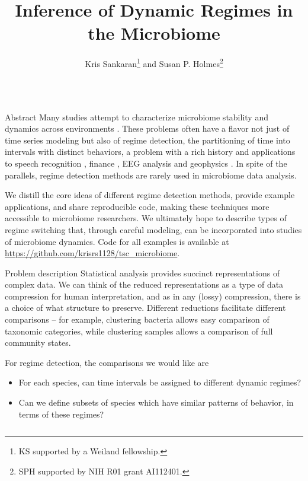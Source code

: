 \documentclass[final, 8pt]{beamer}
\title{Inference of Dynamic Regimes in the Microbiome}
\author{Kris Sankaran\footnote{KS supported by a Weiland fellowship.} and Susan P. Holmes\footnote{SPH supported by NIH R01 grant AI112401.}}
\institute{Department of Statistics, Stanford University}
\newlength{\onecolwid}
\begin{document}
\begin{frame}

\begin{columns}
\begin{column}{\onecolwid}

\begin{block}{Abstract}
Many studies attempt to characterize microbiome stability and dynamics across
environments \citep{costello2012application, stein2013ecological,
  faust2015metagenomics}. These problems often have a flavor not just of time
series modeling but also of regime detection, the partitioning of time into
intervals with distinct behaviors, a problem with a rich history and applications
to speech recognition \citep{fox2011sticky}, finance \citep{lee2009optimal}, EEG
analysis \citep{camilleri2014automatic} and geophysics
\citep{weatherley2002relationship}. In spite of the parallels, regime detection
methods are rarely used in microbiome data analysis.

We distill the core ideas of different regime detection methods, provide example
applications, and share reproducible code, making these techniques more
accessible to microbiome researchers. We ultimately hope to describe types of
regime switching that, through careful modeling, can be incorporated into
studies of microbiome dynamics. Code for all examples is available at
\url{https://github.com/krisrs1128/tsc\_microbiome}.
\end{block}

\begin{block}{Problem description}
Statistical analysis provides succinct representations of complex data. We can
think of the reduced representations as a type of data compression for human
interpretation, and as in any (lossy) compression, there is a choice of what
structure to preserve. Different reductions facilitate different comparisons --
for example, clustering bacteria allows easy comparison of taxonomic categories,
while clustering samples allows a comparison of full community states.

For regime detection, the comparisons we would like are
\begin{itemize}
\item For each species, can time intervals be assigned to different dynamic
  regimes?
\item Can we define subsets of species which have similar patterns of behavior,
  in terms of these regimes?
\end{itemize}
\end{block}


\end{column}
\end{columns}
\end{frame}
\end{document}

